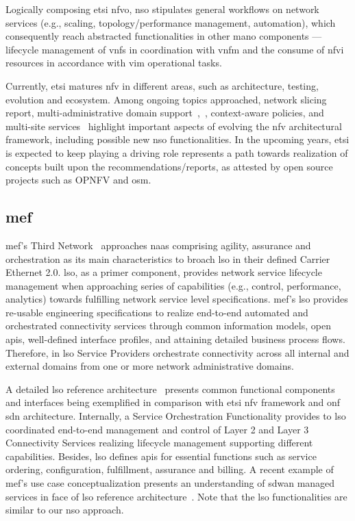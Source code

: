 Logically composing \gls{etsi} \gls{nfvo}, \gls{nso} stipulates general workflows on network services (e.g., scaling, topology/performance management, automation), which consequently reach abstracted functionalities in other \gls{mano} components --- lifecycle management of \glspl{vnf} in coordination with \gls{vnfm} and the consume of \gls{nfvi} resources in accordance with \gls{vim} operational tasks.

Currently, \gls{etsi} matures \gls{nfv} in different areas, such as architecture, testing, evolution and ecosystem. Among ongoing topics approached, network slicing report, multi-administrative domain support~\cite{ETSIIndustrySpecificationGroupISGNFV2014NetworkOptions},~\cite{ETSIGRDomains}, context-aware policies, and multi-site services~\cite{ETSIISGNFV2018} highlight important aspects of evolving the \gls{nfv} architectural framework, including possible new \gls{nso} functionalities. 
In the upcoming years, \gls{etsi} is expected to keep playing a driving role represents a path towards realization of concepts built upon the recommendations/reports, as attested by open source projects such as OPNFV and \gls{osm}.

\subsection{\acrfull{mef}}
\acrfull{mef}'s Third Network~\cite{MEF:Third:2015} approaches \gls{naas} comprising agility, assurance and orchestration as its main characteristics to broach \gls{lso} in their defined Carrier Ethernet 2.0. \gls{lso}, as a primer component, provides network service lifecycle management when approaching series of capabilities (e.g., control, performance, analytics) towards fulfilling network service level specifications. \acrfull{mef}'s \gls{lso} provides re-usable engineering specifications to realize end-to-end automated and orchestrated connectivity services through common information models, open \glspl{api}, well-defined interface profiles, and attaining detailed business process flows. Therefore, in \gls{lso} Service Providers orchestrate connectivity across all internal and external domains from one or more network administrative domains. 

A detailed \gls{lso} reference architecture~\cite{MEF:LSO:2016} presents common functional components and interfaces being exemplified in comparison with \gls{etsi} \gls{nfv} framework and \gls{onf} \gls{sdn} architecture. Internally, a Service Orchestration Functionality provides to \gls{lso} coordinated end-to-end management and control of Layer 2 and Layer 3 Connectivity Services realizing lifecycle management supporting different capabilities.
Besides, \gls{lso} defines \glspl{api} for essential functions such as service ordering, configuration, fulfillment, assurance and billing. A recent example of \gls{mef}'s use case conceptualization presents an understanding of \gls{sdwan} managed services in face of \gls{lso} reference architecture~\cite{MEF:SDWAN:2017}. Note that the \gls{lso} functionalities are similar to our \gls{nso} approach.

